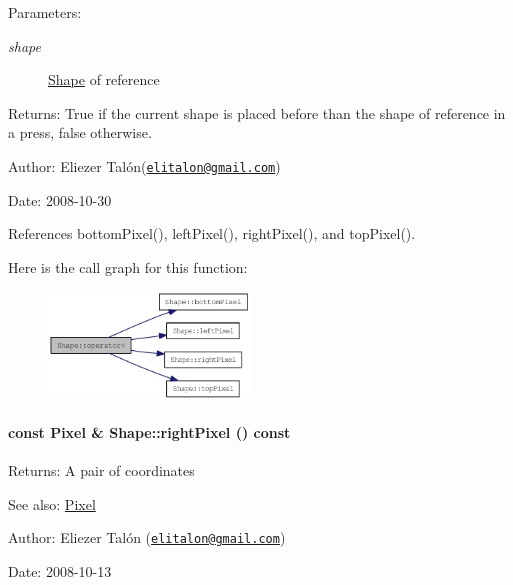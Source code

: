 \begin{Desc}
\item[Parameters:]
\begin{description}
\item[{\em shape}]\hyperlink{class_shape}{Shape} of reference\end{description}
\end{Desc}
\begin{Desc}
\item[Returns:]True if the current shape is placed before than the shape of reference in a press, false otherwise.\end{Desc}
\begin{Desc}
\item[Author:]Eliezer Talón(\href{mailto:elitalon@gmail.com}{\tt elitalon@gmail.com}) \end{Desc}
\begin{Desc}
\item[Date:]2008-10-30 \end{Desc}


References bottomPixel(), leftPixel(), rightPixel(), and topPixel().

Here is the call graph for this function:\nopagebreak
\begin{figure}[H]
\begin{center}
\leavevmode
\includegraphics[width=152pt]{class_shape_183a6bc428172ced8122ffb68d0f04ef_cgraph}
\end{center}
\end{figure}
\hypertarget{class_shape_c265e43fa90ee2ab7c9cd3a3d1e96d82}{
\paragraph[{rightPixel}]{\setlength{\rightskip}{0pt plus 5cm}const {\bf Pixel} \& Shape::rightPixel () const}\hfill}
\label{class_shape_c265e43fa90ee2ab7c9cd3a3d1e96d82}


\begin{Desc}
\item[Returns:]A pair of coordinates\end{Desc}
\begin{Desc}
\item[See also:]\hyperlink{_shape_8hpp_535e59456e3e633842529cfa8ea103c4}{Pixel}\end{Desc}
\begin{Desc}
\item[Author:]Eliezer Talón (\href{mailto:elitalon@gmail.com}{\tt elitalon@gmail.com}) \end{Desc}
\begin{Desc}
\item[Date:]2008-10-13 \end{Desc}


